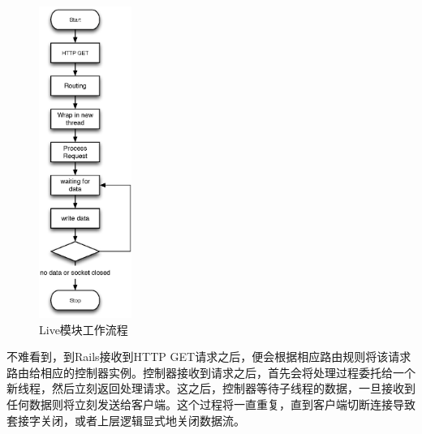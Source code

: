 \begin{figure}[h]
\centering
\includegraphics[width=0.27\textwidth]{images/detail/live-process.eps}
\caption{Live模块工作流程}
\label{fig-live-process}
\end{figure}

不难看到，到Rails接收到HTTP GET请求之后，便会根据相应路由规则将该请求路由给相应的控制器实例。控制器接收到请求之后，首先会将处理过程委托给一个新线程，然后立刻返回处理请求。这之后，控制器等待子线程的数据，一旦接收到任何数据则将立刻发送给客户端。这个过程将一直重复，直到客户端切断连接导致套接字关闭，或者上层逻辑显式地关闭数据流。



